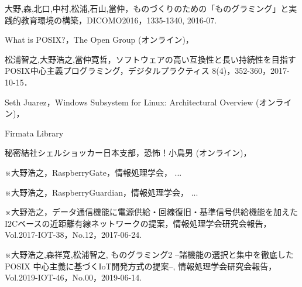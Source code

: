 \begin{thebibliography}{2}

  大野,森,北口,中村,松浦,石山,當仲，ものづくりのための「ものグラミング」と実践的教育環境の構築，DICOMO2016，1335-1340, 2016-07.

  What is POSIX?，The Open Group (オンライン)，

  松浦智之,大野浩之,當仲寛哲，ソフトウェアの高い互換性と長い持続性を目指すPOSIX中心主義プログラミング，デジタルプラクティス 8(4)，352-360，2017-10-15．

  Seth Juarez，Windows Subsystem for Linux: Architectural Overview (オンライン)，

  Firmata Library

  秘密結社シェルショッカー日本支部，恐怖！小鳥男 (オンライン)，

  ※大野浩之，RaspberryGate，情報処理学会， ...

  ※大野浩之，RaspberryGuardian，情報処理学会， ...

  ※大野浩之，データ通信機能に電源供給・回線復旧・基準信号供給機能を加えたI2Cベースの近距離有線ネットワークの提案，情報処理学会研究会報告，Vol.2017-IOT-38，No.12，2017-06-24.

  ※大野浩之,森祥寛,松浦智之,  ものグラミング2 --諸機能の選択と集中を徹底したPOSIX 中心主義に基づくIoT開発方式の提案--, 情報処理学会研究会報告，Vol.2019-IOT-46，No.00，2019-06-14.

\end{thebibliography}

